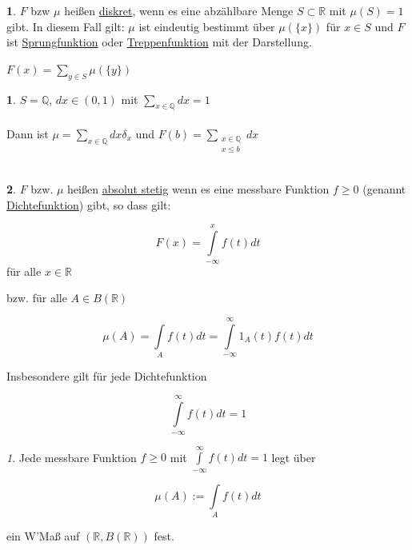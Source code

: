 \documentclass[10pt,a4paper]{report}
\newcommand{\R}{\mathbb{R}}
\numberwithin{equation}{section}
\numberwithin{figure}{section}
\theoremstyle{plain}
\theoremstyle{definition}
\newtheorem{defn}{\protect\definitionname}[section]
\theoremstyle{plain}
\theoremstyle{definition}
\newtheorem{example}{\protect\examplename}[section]
\theoremstyle{remark}
\newtheorem{rem}{\protect\remarkname}[section]
\theoremstyle{plain}
\theoremstyle{plain}
\theoremstyle{plain}
\theoremstyle{plain}
\theoremstyle{plain}
\providecommand{\definitionname}{Definition}
\providecommand{\examplename}{Beispiel}
\providecommand{\remarkname}{Bemerkung}
\newcommand{\1}{ \mathbb{1} } %
\begin{document}
\begin{defn}
  $F$ bzw $\mu$ heißen \underline{diskret}, wenn es eine abzählbare
  Menge $S \subset \R$ mit $\mu(S)=1$ gibt. In diesem Fall gilt: $\mu$
  ist eindeutig bestimmt über $\mu(\{x\})$ für $x \in S$ und $F$ ist
  \underline{Sprungfunktion} oder \underline{Treppenfunktion} mit der
  Darstellung.
  \begin{center}
    $F(x)=\sum\limits_{y \in S} \mu(\{y\})$
  \end{center}
\end{defn}
\begin{example}
  $S=\mathbb{Q}$, $dx \in (0,1)$ mit $\sum\limits_{x \in \mathbb{Q}} dx=1$\\\\
  Dann ist $\mu=\sum\limits_{x \in \mathbb{Q} }dx\delta_x$ und $F(b)=\sum\limits_{\substack{x \in \mathbb{Q}\\ x \leq b}} dx$\\\\
\end{example}
\begin{defn}
  $F$ bzw. $\mu$ heißen \underline{absolut stetig} wenn es eine
  messbare Funktion $f\geq 0$ (genannt \underline{Dichtefunktion})
  gibt, so dass gilt:
  \begin{center}
    \[F(x)=\int\limits_{-\infty}^xf(t)dt\] für alle $x \in \R$
  \end{center}
  bzw. für alle $A \in B(\R)$
  \begin{center}
    \[\mu(A)=\int\limits_A f(t) dt=\int\limits_{-\infty}^\infty
    1_A(t)f(t)dt\]
  \end{center}
  Insbesondere gilt für jede Dichtefunktion
  \begin{center}
    \[\int\limits_{-\infty}^\infty f(t)dt=1\]
  \end{center}
\end{defn}
\begin{rem}
  Jede messbare Funktion $f \geq 0$ mit $\int\limits_{-\infty}^\infty
  f(t)dt=1$ legt über
  \begin{center}
    \[\mu(A):=\int\limits_Af(t)dt\]
  \end{center}
  ein W'Maß auf $(\R,B(\R))$ fest.\\\\
\end{rem}
\end{document}
